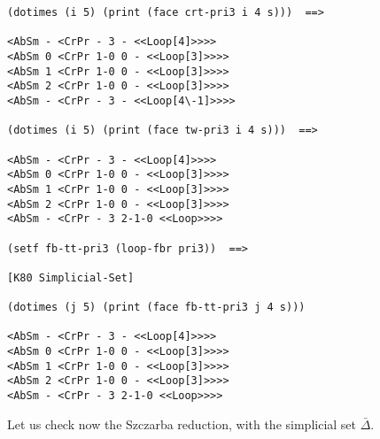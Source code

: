 \newpage
{\footnotesize\begin{verbatim}
(dotimes (i 5) (print (face crt-pri3 i 4 s)))  ==>

<AbSm - <CrPr - 3 - <<Loop[4]>>>> 
<AbSm 0 <CrPr 1-0 0 - <<Loop[3]>>>> 
<AbSm 1 <CrPr 1-0 0 - <<Loop[3]>>>> 
<AbSm 2 <CrPr 1-0 0 - <<Loop[3]>>>> 
<AbSm - <CrPr - 3 - <<Loop[4\-1]>>>> 

(dotimes (i 5) (print (face tw-pri3 i 4 s)))  ==>

<AbSm - <CrPr - 3 - <<Loop[4]>>>> 
<AbSm 0 <CrPr 1-0 0 - <<Loop[3]>>>> 
<AbSm 1 <CrPr 1-0 0 - <<Loop[3]>>>> 
<AbSm 2 <CrPr 1-0 0 - <<Loop[3]>>>> 
<AbSm - <CrPr - 3 2-1-0 <<Loop>>>> 

(setf fb-tt-pri3 (loop-fbr pri3))  ==>

[K80 Simplicial-Set]

(dotimes (j 5) (print (face fb-tt-pri3 j 4 s)))

<AbSm - <CrPr - 3 - <<Loop[4]>>>> 
<AbSm 0 <CrPr 1-0 0 - <<Loop[3]>>>> 
<AbSm 1 <CrPr 1-0 0 - <<Loop[3]>>>> 
<AbSm 2 <CrPr 1-0 0 - <<Loop[3]>>>> 
<AbSm - <CrPr - 3 2-1-0 <<Loop>>>> 
\end{verbatim}}
Let us check now the Szczarba reduction, with the simplicial set $\bar{\Delta}$.
